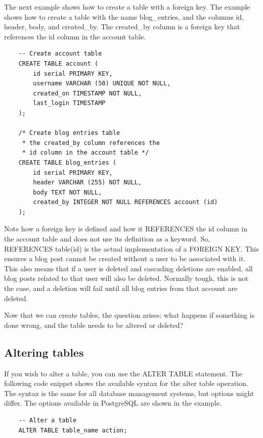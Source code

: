 The next example shows how to create a table with a foreign key. The example shows how to create a table with the name blog\_entries, and the columns id, header, body, and created\_by. The created\_by column is a foreign key that references the id column in the account table. 

\begin{verbatim}
    -- Create account table
    CREATE TABLE account (
        id serial PRIMARY KEY,
        username VARCHAR (50) UNIQUE NOT NULL,
        created_on TIMESTAMP NOT NULL, 
        last_login TIMESTAMP
    );
    
    /* Create blog entries table
     * the created_by column references the 
     * id column in the account table */
    CREATE TABLE blog_entries (
        id serial PRIMARY KEY, 
        header VARCHAR (255) NOT NULL,
        body TEXT NOT NULL,
        created_by INTEGER NOT NULL REFERENCES account (id)
    );
\end{verbatim}

Note how a foreign key is defined and how it REFERENCES the id column in the account table and does not use its definition as a keyword. So, REFERENCES table(id) is the actual implementation of a FOREIGN KEY. This ensures a blog post cannot be created without a user to be associated with it. This also means that if a user is deleted and cascading deletions are enabled, all blog posts related to that user will also be deleted. Normally tough, this is not the case, and a deletion will fail until all blog entries from that account are deleted.

Now that we can create tables, the question arises: what happens if something is done wrong, and the table needs to be altered or deleted? 

\subsection{Altering tables}
If you wish to alter a table, you can use the ALTER TABLE statement. The following code snippet shows the available syntax for the alter table operation. The syntax is the same for all database management systems, but options might differ. The options available in PostgreSQL are shown in the example.

\begin{verbatim}
    -- Alter a table
    ALTER TABLE table_name action;
\end{verbatim}

